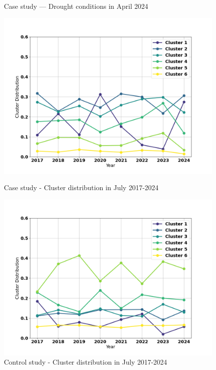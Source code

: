 \documentclass[10pt,twocolumn]{article}
\begin{document}
\begin{figure}[h]
\begin{minipage}{1\columnwidth}
      \caption{Case study — Drought conditions in April 2024}
      \label{fig:case_april_lr_2024}
  \end{minipage}

\end{figure}


\begin{figure}[h]
  \centering

  \begin{minipage}{1\columnwidth}
      \centering
      \includegraphics[width=\textwidth]{images/results/july/case/cluster_distribution_6_july.png}
      \caption{Case study - Cluster distribution in July 2017-2024}
      \label{fig:case_july_clust_dist}
  \end{minipage}
  \hfill
  \begin{minipage}{1\columnwidth}
      \centering
      \includegraphics[width=\textwidth]{images/results/july/control/cluster_distribution_6_july.png}
      \caption{Control study - Cluster distribution in July 2017-2024}
      \label{fig:control_july_clust_dist}
  \end{minipage}

\end{figure}
\end{document}
